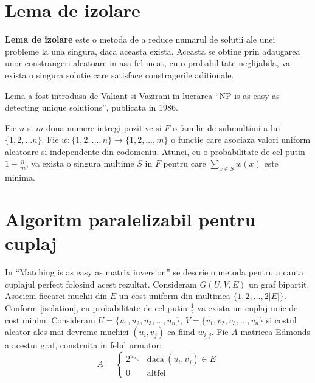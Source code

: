 \pagebreak

\section{Lema de izolare}
\textbf{Lema de izolare} este o metoda de a reduce numarul de solutii ale unei
probleme la una singura, daca aceasta exista. Aceasta se obtine prin adaugarea
unor constrangeri aleatoare in asa fel incat, cu o probabilitate neglijabila,
va exista o singura solutie care satisface constragerile aditionale.

Lema a fost introdusa de Valiant si Vazirani in lucrarea ``NP is as easy as
detecting unique solutions'', publicata in 1986.

\begin{thm}
  \label{isolation}
  Fie $n$ si $m$ doua numere intregi pozitive si $F$ o familie de submultimi a
  lui $\{1, 2, \ldots n\}$. Fie
  $w : \{1, 2, \ldots, n\} \to \{1, 2, \ldots, m\}$ o functie care asociaza
  valori uniform aleatoare si independente din codomeniu. Atunci, cu o
  probabilitate de cel putin $1 - \frac{n}{m}$, va exista o singura multime $S$ in
  $F$ pentru care $\sum_{x\in S}{w(x)}$ este minima.
\end{thm}

\pagebreak

\section{Algoritm paralelizabil pentru cuplaj}
\label{Algoritm paralelizabil pentru cuplaj}

In ``Matching is as easy as matrix inversion'' \cite{matchingezmatrix} se
descrie o metoda pentru a cauta cuplajul perfect folosind acest rezultat.
Consideram $G(U, V, E)$ un graf bipartit. Asociem fiecarei muchii din $E$ un
cost uniform din multimea $\{1, 2, \ldots, 2|E|\}$. Conform \ref{isolation}, cu
probabilitate de cel putin $\frac{1}{2}$ va exista un cuplaj unic de cost minim.
Consideram $U = \{u_{1}, u_{2}, u_{3}, \ldots, u_{n}\}$,
$V = \{v_{1}, v_{2}, v_{3}, \ldots, v_{n}\}$ si costul aleator ales mai devreme muchiei
$(u_{i}, v_{j})$ ca fiind $w_{i,j}$. Fie $A$ matricea Edmonds a acestui
graf, construita in felul urmator:
\begin{equation}
A=
\begin{cases}
  2^{w_{i,j}} & \text{daca}\ (u_{i}, v_{j}) \in E \\
  0 & \text{altfel}
\end{cases}
\end{equation}

